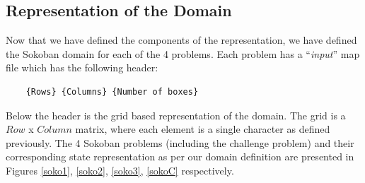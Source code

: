 \documentclass[10pt, letter]{article}
\begin{document}

\subsection*{Representation of the Domain}
Now that we have defined the components of the representation, we have defined the Sokoban domain for each of the 4 problems. Each problem has a ``\textit{input}'' map file which has the following header:
\begin{verbatim}
	{Rows} {Columns} {Number of boxes}
\end{verbatim}
Below the header is the grid based representation of the domain. The grid is a $Row$ x $Column$ matrix, where each element is a single character as defined previously. The 4 Sokoban problems (including the challenge problem) and their corresponding state representation as per our domain definition are presented in Figures \ref{soko1}, \ref{soko2}, \ref{soko3}, \ref{sokoC} respectively.
\end{document}
